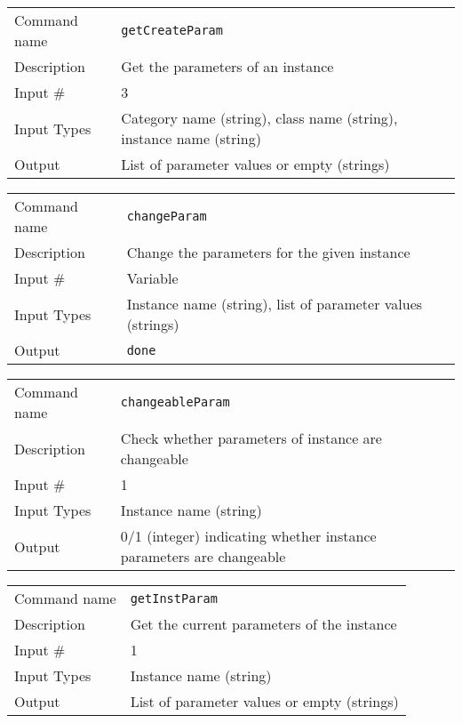 \bigskip

\noindent
\begin{tabular}{l|p{5in}}
\hline
Command name & {\tt getCreateParam} \\
Description  & Get the parameters of an instance \\
Input \#     & 3 \\
Input Types  & Category name (string), class name (string), instance
               name (string) \\
Output       & List of parameter values or empty (strings) \\
\hline
\end{tabular}

\bigskip

\noindent
\begin{tabular}{l|p{5in}}
\hline
Command name & {\tt changeParam} \\
Description  & Change the parameters for the given instance \\
Input \#     & Variable \\
Input Types  & Instance name (string), list of parameter values (strings) \\
Output       & {\tt done} \\
\hline
\end{tabular}

\bigskip

\noindent
\begin{tabular}{l|p{5in}}
\hline
Command name & {\tt changeableParam} \\
Description  & Check whether parameters of instance are changeable \\
Input \#     & 1 \\
Input Types  & Instance name (string) \\
Output       & 0/1 (integer) indicating whether instance parameters are
               changeable \\
\hline
\end{tabular}

\bigskip

\noindent
\begin{tabular}{l|p{5in}}
\hline
Command name & {\tt getInstParam} \\
Description  & Get the current parameters of the instance \\
Input \#     & 1 \\
Input Types  & Instance name (string) \\
Output       & List of parameter values or empty (strings) \\
\hline
\end{tabular}

